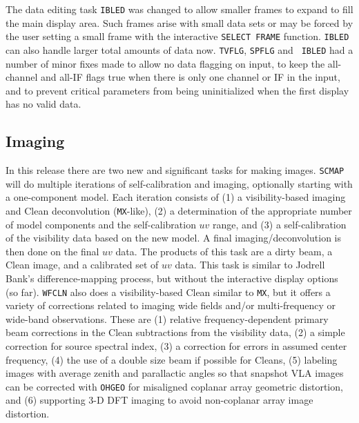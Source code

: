 The data editing task {\tt IBLED} was changed to allow smaller frames
to expand to fill the main display area.  Such frames arise with small
data sets or may be forced by the user setting a small frame with the
interactive {\tt SELECT FRAME} function.  {\tt IBLED} can also handle
larger total amounts of data now.  {\tt TVFLG}, {\tt SPFLG} and {\tt
IBLED} had a number of minor fixes made to allow no data flagging on
input, to keep the all-channel and all-IF flags true when there is
only one channel or IF in the input, and to prevent critical
parameters from being uninitialized when the first display has no
valid data.

\subsection{Imaging}

In this release there are two new and significant tasks for making
images.  {\tt SCMAP} will do multiple iterations of self-calibration
and imaging, optionally starting with a one-component model.  Each
iteration consists of (1) a visibility-based imaging and Clean
deconvolution ({\tt MX}-like), (2) a determination of the appropriate
number of model components and the self-calibration $uv$ range, and
(3) a self-calibration of the visibility data based on the new model.
A final imaging/deconvolution is then done on the final $uv$ data.
The products of this task are a dirty beam, a Clean image, and a
calibrated set of $uv$ data.  This task is similar to Jodrell Bank's
difference-mapping process, but without the interactive display
options (so far).  {\tt WFCLN} also does a visibility-based Clean
similar to {\tt MX}, but it offers a variety of corrections related to
imaging wide fields and/or multi-frequency or wide-band observations.
These are (1) relative frequency-dependent primary beam corrections in
the Clean subtractions from the visibility data, (2) a simple
correction for source spectral index, (3) a correction for errors in
assumed center frequency, (4) the use of a double size beam if
possible for Cleans, (5) labeling images with average zenith and
parallactic angles so that snapshot VLA images can be corrected with
{\tt OHGEO} for misaligned coplanar array geometric distortion, and
(6) supporting 3-D DFT imaging to avoid non-coplanar array image
distortion.

